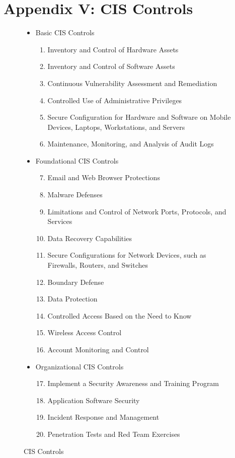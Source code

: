 \documentclass{article}
\begin{document}
\newpage
\section{Appendix V: CIS Controls}
\begin{figure}[h]
    \begin{itemize}
    \item{Basic CIS Controls}
        \begin{enumerate}
        \item{Inventory and Control of Hardware Assets}
        \item{Inventory and Control of Software Assets}
        \item{Continuous Vulnerability Assessment and Remediation}
        \item{Controlled Use of Administrative Privileges}
        \item{Secure Configuration for Hardware and Software on Mobile Devices, Laptops, Workstations, and Servers}
        \item{Maintenance, Monitoring, and Analysis of Audit Logs}
        \end{enumerate}
    \item{Foundational CIS Controls}
        \begin{enumerate}
        \setcounter{enumi}{6}
        \item{Email and Web Browser Protections}
        \item{Malware Defenses}
        \item{Limitations and Control of Network Ports, Protocols, and Services}
        \item{Data Recovery Capabilities}
        \item{Secure Configurations for Network Devices, such as Firewalls, Routers, and Switches}
        \item{Boundary Defense}
        \item{Data Protection}
        \item{Controlled Access Based on the Need to Know}
        \item{Wireless Access Control}
        \item{Account Monitoring and Control}
        \end{enumerate}
    \item{Organizational CIS Controls}
        \begin{enumerate}
        \setcounter{enumi}{16}
        \item{Implement a Security Awareness and Training Program}
        \item{Application Software Security}
        \item{Incident Response and Management}
        \item{Penetration Tests and Red Team Exercises}
        \end{enumerate}
    \end{itemize}
    \caption{CIS Controls \citep{center_for_internet_security_cis_2018}}
    \label{enumerate:center_for_internet_security_cis_2018}
\end{figure}
\end{document}
